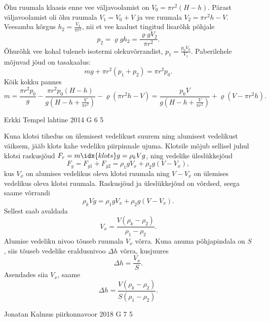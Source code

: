 \documentclass[11pt]{article}
\begin{document}
{{\ifSolution
Õhu ruumala klaasis enne vee väljavoolamist on 
$V_0 = \pi r^2 (H-h)$.
Pärast väljavoolamist oli õhu ruumala
$V_1 = V_0 + V$
ja vee ruumala
$V_2 = \pi r^2 h - V$.
Veesamba kõrgus
$h_2 = \frac{ V_2 }{ \pi r^2 }$,
nii et vee kaalust tingitud lisarõhk põhjale
\[
p_2 = \varrho g h_2 = \frac{ \varrho g V_2 }{ \pi r^2 }.
\]
Õhurõhk vee kohal tuleneb isotermi olekuvõrrandist,
$p_1 = \frac{p_0 V_0}{V_1}$.
Paberilehele mõjuvad jõud on tasakaalus:
\[
mg + \pi r^2 (p_1 + p_2) = \pi r^2 p_0.
\]
Kõik kokku pannes
\[ m =
\frac{ \pi r^2 p_0 }{ g } -
\frac{ \pi r^2 p_0 (H-h) }{ g \left( H - h + \frac{V}{\pi r^2} \right) } -
\varrho \left( \pi r^2 h - V \right)
=
\frac{ p_0 V }{ g \left( H - h + \frac{V}{ \pi r^2 } \right) } + \varrho \left( V - \pi r^2 h \right).
\]
\fi
}

{Erkki Tempel} %
{lahtine} %
{2014} %
{G 6} %
{5} %
{

\ifSolution
Kuna klotsi tihedus on ülemisest vedelikust suurem ning alumisest vedelikust väiksem, jääb klots kahe vedeliku piirpinnale ujuma. Klotsile mõjub sellisel juhul klotsi raskusjõud $F_r = m\idx{klots}g=\rho_k Vg$, ning vedelike üleslükkejõud
\[ F_y=F_{y1}+F_{y2}=\rho_1gV_x + \rho_2g(V-V_x), \]
kus $V_x$ on alumises vedelikus oleva klotsi ruumala ning $V-V_x$ on ülemises vedelikus oleva klotsi ruumala.
Raskusjõud ja üleslükkejõud on võrdsed, seega saame võrrandi
\[ \rho_k Vg = \rho_1gV_x + \rho_2g(V-V_x). \]
Sellest saab avaldada 
\[ V_x = \frac{V(\rho_k-\rho_2)}{\rho_1-\rho_2}. \]
Alumise vedeliku nivoo tõuseb ruumala $V_x$ võrra. Kuna anuma põhjapindala on $S$, siis tõuseb vedelike eraldusnivoo $\Delta h$ võrra, kusjuures
\[ \Delta h = \frac{V_x}{S}. \]
Asendades siia $V_x$, saame
\[ \Delta h = \frac{V(\rho_k-\rho_2)}{S(\rho_1-\rho_2)}. \]
\fi
}

{Jonatan Kalmus} %
{piirkonnavoor} %
{2018} %
{G 7} %
{5} %
{

}}
\end{document}
